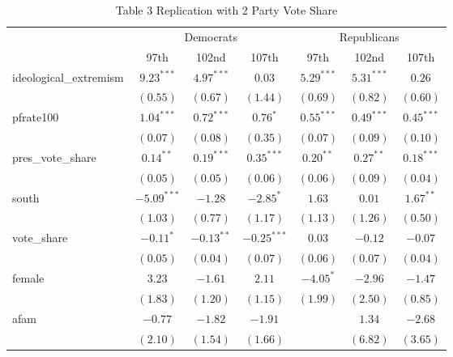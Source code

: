\documentclass[12pt]{article}
\begin{document}
\begin{table}
	\begin{center}
		\caption{Table 3 Replication with 2 Party Vote Share}
		\begin{tabular}{l c c c c c c }
			\hline
			& \multicolumn{3}{c}{Democrats} & \multicolumn{3}{c}{Republicans} \\
			\cline{2-7}
			& 97th & 102nd & 107th & 97th & 102nd & 107th \\
			\hline
			ideological\_extremism & $9.23^{***}$  & $4.97^{***}$ & $0.03$        & $5.29^{***}$ & $5.31^{***}$  & $0.26$        \\
			& $(0.55)$      & $(0.67)$     & $(1.44)$      & $(0.69)$     & $(0.82)$      & $(0.60)$      \\
			pfrate100              & $1.04^{***}$  & $0.72^{***}$ & $0.76^{*}$    & $0.55^{***}$ & $0.49^{***}$  & $0.45^{***}$  \\
			& $(0.07)$      & $(0.08)$     & $(0.35)$      & $(0.07)$     & $(0.09)$      & $(0.10)$      \\
			pres\_vote\_share      & $0.14^{**}$   & $0.19^{***}$ & $0.35^{***}$  & $0.20^{**}$  & $0.27^{**}$   & $0.18^{***}$  \\
			& $(0.05)$      & $(0.05)$     & $(0.06)$      & $(0.06)$     & $(0.09)$      & $(0.04)$      \\
			south                  & $-5.09^{***}$ & $-1.28$      & $-2.85^{*}$   & $1.63$       & $0.01$        & $1.67^{**}$   \\
			& $(1.03)$      & $(0.77)$     & $(1.17)$      & $(1.13)$     & $(1.26)$      & $(0.50)$      \\
			vote\_share            & $-0.11^{*}$   & $-0.13^{**}$ & $-0.25^{***}$ & $0.03$       & $-0.12$       & $-0.07$       \\
			& $(0.05)$      & $(0.04)$     & $(0.07)$      & $(0.06)$     & $(0.07)$      & $(0.04)$      \\
			female                 & $3.23$        & $-1.61$      & $2.11$        & $-4.05^{*}$  & $-2.96$       & $-1.47$       \\
			& $(1.83)$      & $(1.20)$     & $(1.15)$      & $(1.99)$     & $(2.50)$      & $(0.85)$      \\
			afam                   & $-0.77$       & $-1.82$      & $-1.91$       &              & $1.34$        & $-2.68$       \\
			& $(2.10)$      & $(1.54)$     & $(1.66)$      &              & $(6.82)$      & $(3.65)$      \\

\end{tabular}
\end{center}
\end{table}
\end{document}
